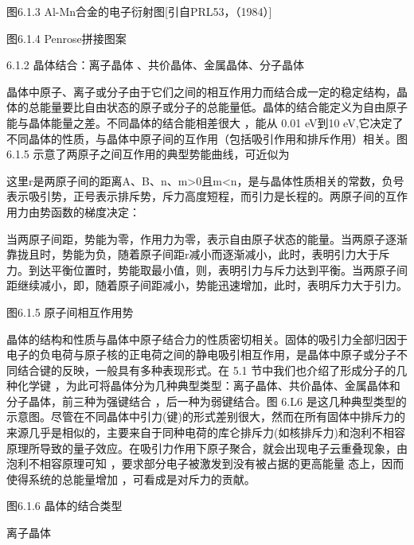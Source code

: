图6.1.3 Al-Mn合金的电子衍射图[引自PRL53，（1984）]



图6.1.4 Penrose拼接图案



6.1.2 	晶体结合：离子晶体 、共价晶体、金属晶体、分子晶体

晶体中原子、离子或分子由于它们之间的相互作用力而结合成一定的稳定结构，晶体的总能量要比自由状态的原子或分子的总能量低。晶体的结合能定义为自由原子能与晶体能量之差。不同晶体的结合能相差很大 ，能从 0.01 eV到10 eV,它决定了不同晶体的性质，与晶体中原子间的互作用（包括吸引作用和排斥作用）相关。图 6.1.5 示意了两原子之间互作用的典型势能曲线，可近似为



这里r是两原子间的距离A、B、n、m>0且m<n，是与晶体性质相关的常数，负号表示吸引势，正号表示排斥势，斥力高度短程，而引力是长程的。两原子间的互作用力由势函数的梯度决定：



当两原子间距，势能为零，作用力为零，表示自由原子状态的能量。当两原子逐渐靠拢且时，势能为负，随着原子间距r减小而逐渐减小，此时，表明引力大于斥力。到达平衡位置时，势能取最小值，则，表明引力与斥力达到平衡。当两原子间距继续减小，即，随着原子间距减小，势能迅速增加，此时，表明斥力大于引力。



图6.1.5 原子间相互作用势

晶体的结构和性质与晶体中原子结合力的性质密切相关。固体的吸引力全部归因于电子的负电荷与原子核的正电荷之间的静电吸引相互作用，是晶体中原子或分子不同结合键的反映，一般具有多种表现形式。在 5.1 节中我们也介绍了形成分子的几种化学键 ，为此可将晶体分为几种典型类型：离子晶体、共价晶体、金属晶体和分子晶体，前三种为强键结合 ，后一种为弱键结合。图 6.L6 是这几种典型类型的示意图。尽管在不同晶体中引力(键)的形式差别很大，然而在所有固体中排斥力的来源几乎是相似的，主要来自于同种电荷的库仑排斥力(如核排斥力)和泡利不相容原理所导致的量子效应。在吸引力作用下原子聚合，就会出现电子云重叠现象，由泡利不相容原理可知 ，要求部分电子被激发到没有被占据的更高能量 态上，因而使得系统的总能量增加 ，可看成是对斥力的贡献。



图6.1.6 晶体的结合类型



离子晶体

